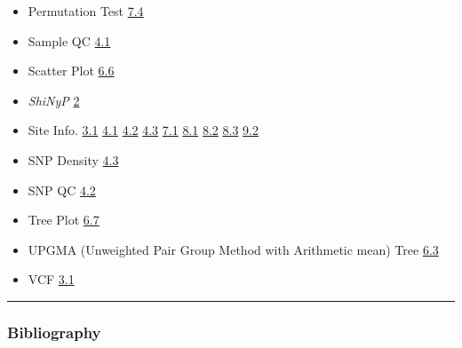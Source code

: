 \documentclass[
]{book}
\begin{document}
\begin{itemize}
\item
  Permutation Test \href{https://teddyenn.github.io/ShiNyP-guide/sec-genetic-diversity.html\#step-2-run-permutation-test}{7.4}
\item
  Sample QC \href{https://teddyenn.github.io/ShiNyP-guide/sec-data-qc.html\#sample-qc}{4.1}
\item
  Scatter Plot \href{https://teddyenn.github.io/ShiNyP-guide/sec-data-qc.html\#sample-qc}{6.6}
\item
  \emph{ShiNyP} \href{https://teddyenn.github.io/ShiNyP-guide/sec-shinyp.html\#sec-shinyp}{2}
\item
  Site Info. \href{https://teddyenn.github.io/ShiNyP-guide/sec-data-input.html\#step-2-transform-to-data.frame}{3.1} \href{https://teddyenn.github.io/ShiNyP-guide/sec-data-qc.html\#sample-qc}{4.1} \href{https://teddyenn.github.io/ShiNyP-guide/sec-data-qc.html\#snp-qc}{4.2} \href{https://teddyenn.github.io/ShiNyP-guide/sec-data-qc.html\#snp-density}{4.3} \href{https://teddyenn.github.io/ShiNyP-guide/sec-genetic-diversity.html\#diversity-parameter}{7.1} \href{https://teddyenn.github.io/ShiNyP-guide/sec-selection-sweep.html\#pcadapt}{8.1} \href{https://teddyenn.github.io/ShiNyP-guide/sec-selection-sweep.html\#outflank}{8.2} \href{https://teddyenn.github.io/ShiNyP-guide/sec-selection-sweep.html\#ibs-identity-by-state}{8.3} \href{https://teddyenn.github.io/ShiNyP-guide/sec-core-collection.html\#core-snp-set}{9.2}
\item
  SNP Density \href{https://teddyenn.github.io/ShiNyP-guide/sec-data-qc.html\#snp-density}{4.3}
\item
  SNP QC \href{https://teddyenn.github.io/ShiNyP-guide/sec-data-qc.html\#snp-qc}{4.2}
\item
  Tree Plot \href{https://teddyenn.github.io/ShiNyP-guide/sec-population-structure.html\#tree-plot-plus}{6.7}
\item
  UPGMA (Unweighted Pair Group Method with Arithmetic mean) Tree \href{https://teddyenn.github.io/ShiNyP-guide/sec-population-structure.html\#upgma-unweighted-pair-group-method-with-arithmetic-mean-tree}{6.3}
\item
  VCF \href{https://teddyenn.github.io/ShiNyP-guide/sec-data-input.html\#vcf}{3.1}
\end{itemize}

\begin{center}\rule{0.5\linewidth}{0.5pt}\end{center}

\subsubsection*{Bibliography}\label{bibliography}

  
\end{document}
